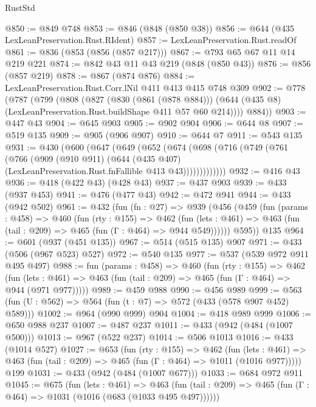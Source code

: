 \begin{lexlean}{RustStd}
\begin{coremodule}
@850 := @849 @748
@853 := @846 (@848 (@850 @38))
@856 := @644 (@435 LexLeanPreservation.Rust.RIdent)
@857 := LexLeanPreservation.Rust.readOf
@861 := @836 (@853 (@856 (@857 @217)))
@867 := @793 @65 @67 @11 @14 @219 @221
@874 := @842 @43 @11 @43 @219 (@848 (@850 @43))
@876 := @856 (@857 @219)
@878 := @867 (@874 @876)
@884 := LexLeanPreservation.Rust.Corr.lNil @411 @413 @415 @748 @309
@902 := @778
    (@787
      (@799
        (@808
          (@827
            (@830 (@861 (@878 @884)))
            (@644 (@435 @8) (LexLeanPreservation.Rust.buildShape @411 @57 @60 @214))))
        @884))
@903 := @447 @43
@904 := @645 @903
@905 := @902 @904
@906 := @644 @8
@907 := @519 @135
@909 := @905 (@906 @907)
@910 := @644 @7
@911 := @543 @135
@931 := @430
    (@600
      (@647
        (@649
          (@652
            (@674
              (@698
                (@716
                  (@749
                    (@761
                      (@766
                        (@909
                          (@910 @911)
                          (@644
                            (@435 @407)
                            (LexLeanPreservation.Rust.fnFallible @413 @43)))))))))))))
@932 := @416 @43
@936 := @418 (@422 @43) (@428 @43)
@937 := @437 @903
@939 := @433 (@937 @453)
@941 := @476 (@477 @43)
@942 := @472 @941
@944 := @433 (@942 @502)
@961 := @432
    (fun (fn : @27) =>
    @939
      (@456
        (@459
          (fun (params : @458) =>
          @460
            (fun (rty : @155) =>
            @462
              (fun (lets : @461) =>
              @463 (fun (tail : @209) => @465 (fun (Γ : @464) => @944 @549))))))
        @595))
    @135
@964 := @601 (@937 (@451 @135))
@967 := @514 (@515 @135) @907
@971 := @433 (@506 (@967 @523) @527)
@972 := @540 @135
@977 := @537 (@539 @972 @911 @495 @497)
@988 := fun (params : @458) =>
  @460
    (fun (rty : @155) =>
    @462
      (fun (lets : @461) => @463 (fun (tail : @209) => @465 (fun (Γ : @464) => @944 (@971 @977)))))
@989 := @459 @988
@990 := @456 @989
@999 := @563 (fun (U : @562) => @564 (fun (t : @7) => @572 (@433 (@578 @907 @452) @589)))
@1002 := @964 (@990 @999) @904
@1004 := @418 @989 @999
@1006 := @650 @988 @237
@1007 := @487 @237
@1011 := @433 (@942 (@484 (@1007 @500)))
@1013 := @967 (@522 @237)
@1014 := @506 @1013
@1016 := @433 (@1014 @527)
@1027 := @653
    (fun (rty : @155) =>
    @462
      (fun (lets : @461) =>
      @463 (fun (tail : @209) => @465 (fun (Γ : @464) => @1011 (@1016 @977)))))
    @199
@1031 := @433 (@942 (@484 (@1007 @677)))
@1033 := @684 @972 @911
@1045 := @675
    (fun (lets : @461) =>
    @463 (fun (tail : @209) => @465 (fun (Γ : @464) => @1031 (@1016 (@683 (@1033 @495 @497))))))

\end{coremodule}
\end{lexlean}
